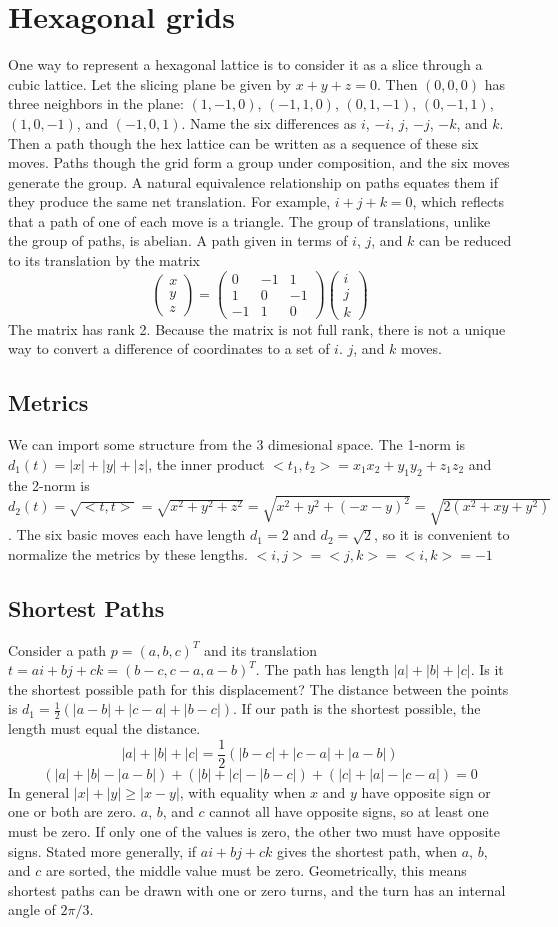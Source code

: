 \documentclass{article}
\newcommand{\matrixthreeone}[3]{\left(\begin{array}{r}#1\\#2\\#3\end{array}\right)}
\newcommand{\matrixthreethree}[9]{\left(\begin{array}{rrr}#1&#2&#3\\#4&#5&#6\\#7&#8&#9\end{array}\right)}
\begin{document}
\section{Hexagonal grids}
One way to represent a hexagonal lattice is to consider it as a slice through a cubic lattice. Let the slicing plane be given by $x+y+z=0$. Then $(0,0,0)$ has three neighbors in the plane: $(1,-1,0)$, $(-1,1,0)$, $(0,1,-1)$, $(0,-1,1)$, $(1,0,-1)$, and $(-1,0,1)$. Name the six differences as $i$, $-i$, $j$, $-j$, $-k$, and $k$. Then a path though the hex lattice can be written as a sequence of these six moves. Paths though the grid form a group under composition, and the six moves generate the group. A natural equivalence relationship on paths equates them if they produce the same net translation. For example, $i+j+k=0$, which reflects that a path of one of each move is a triangle. The group of translations, unlike the group of paths, is abelian. A path given in terms of $i$, $j$, and $k$ can be reduced to its translation by the matrix 
\[
\matrixthreeone{x}{y}{z} = 
\matrixthreethree {0}{-1}{1} {1}{0}{-1} {-1}{1}{0}
\matrixthreeone{i}{j}{k}
\]
The matrix has rank 2. Because the matrix is not full rank, there is not a unique way to convert a difference of coordinates to a set of $i$. $j$, and $k$ moves.

\subsection{Metrics}
We can import some structure from the 3 dimesional space. The 1-norm is $d_1(t)=|x|+|y|+|z|$, the inner product $<t_1,t_2>=x_1x_2+y_1y_2+z_1z_2$ and the 2-norm is $d_2(t)=\sqrt{<t,t>}=\sqrt{x^2+y^2+z^2}=\sqrt{x^2+y^2+(-x-y)^2}=\sqrt{2(x^2+xy+y^2)}$. The six basic moves each have length $d_1=2$ and $d_2=\sqrt{2}$, so it is convenient to normalize the metrics by these lengths. $<i,j>=<j,k>=<i,k>=-1$

\subsection{Shortest Paths}
Consider a path $p = (a,b,c)^T$ and its translation $t=ai+bj+ck=(b-c,c-a,a-b)^T$. The path has length $|a|+|b|+|c|$. Is it the shortest possible path for this displacement? The distance between the points is $d_1=\frac{1}{2}(|a-b|+|c-a|+|b-c|)$. If our path is the shortest possible, the length must equal the distance.
\[ |a|+|b|+|c|=\frac{1}{2}(|b-c|+|c-a|+|a-b|) \]
\[ (|a|+|b|-|a-b|)+(|b|+|c|-|b-c|)+(|c|+|a|-|c-a|)=0 \]
In general $|x|+|y|\geq|x-y|$, with equality when $x$ and $y$ have opposite sign or one or both are zero. $a$, $b$, and $c$ cannot all have opposite signs, so at least one must be zero.  If only one of the values is zero, the other two must have opposite signs.  Stated more generally, if $ai+bj+ck$ gives the shortest path, when $a$, $b$, and $c$ are sorted, the middle value must be zero.  Geometrically, this means shortest paths can be drawn with one or zero turns, and the turn has an internal angle of $2\pi/3$.
\end{document}
